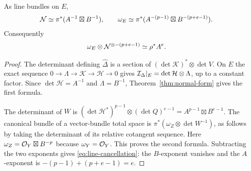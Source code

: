 \begin{proposition}\label{prop:canonical-line}
As line bundles on $E$,
\begin{equation}\label{eq:two-lines}
 \mathcal N\simeq\pi^*(A^{-1}\boxtimes B^{-1}),\qquad
 \omega_E\simeq\pi^*(A^{-(p-1)}\boxtimes B^{-(p+e-1)}).
\end{equation}
Consequently
\begin{equation}\label{eq:line-cancellation}
 \omega_E\otimes\mathcal N^{\otimes-(p+e-1)}\simeq\rho^*A^e.
\end{equation}
\end{proposition}
\begin{proof}
The determinant defining $\widehat\Delta$ is a section of
$(\det\mathcal K)^*\otimes\det V$. On $E$ the exact sequence
$0\to\Lambda\to\mathcal K\to\mathcal H\to0$ gives
$\mathcal I_\Delta|_E=\det\mathcal H\otimes\Lambda$, up to a constant
factor. Since $\det\mathcal H=A^{-1}$ and $\Lambda=B^{-1}$,
Theorem~\ref{thm:normal-form} gives the first formula.

The determinant of $W$ is
$(\det\mathcal H^*)^{p-1}\otimes(\det Q)^{e-1}
=A^{p-1}\boxtimes B^{e-1}$.
The canonical bundle of a vector-bundle total space is
$\pi^*(\omega_Z\otimes\det W^{-1})$, as follows by taking the
determinant of its relative cotangent sequence. Here
$\omega_Z=\mathcal O_Y\boxtimes B^{-p}$ because $\omega_Y=\mathcal O_Y$.
This proves the second formula. Subtracting the two exponents gives
\eqref{eq:line-cancellation}: the $B$-exponent vanishes and the
$A$-exponent is $-(p-1)+(p+e-1)=e$.
\end{proof}

